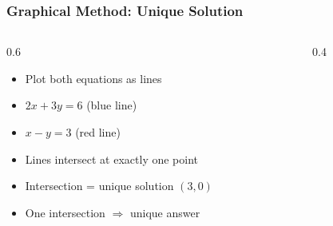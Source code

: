 \begin{frame}[fragile]\frametitle{Graphical Method: Unique Solution}
  \begin{columns}
    \begin{column}[T]{0.6\linewidth}
      \begin{itemize}
        \item Plot both equations as lines
        \item $2x + 3y = 6$ (blue line)
        \item $x - y = 3$ (red line)
        \item Lines intersect at exactly one point
        \item Intersection = unique solution $(3, 0)$
        \item One intersection $\Rightarrow$ unique answer
      \end{itemize}
    \end{column}
    \begin{column}[T]{0.4\linewidth}
      \begin{center}
      \end{center}
    \end{column}
  \end{columns}
\end{frame}

